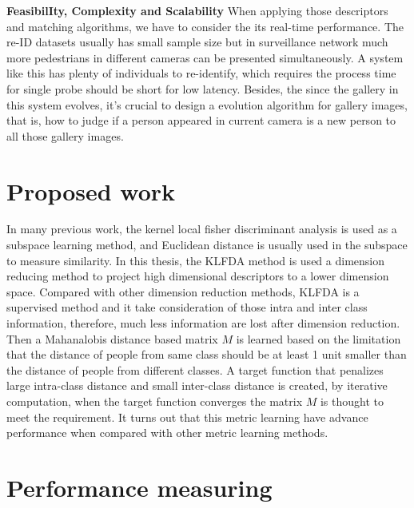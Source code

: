 \textbf{FeasibilIty, Complexity and Scalability} When applying those descriptors and matching algorithms, we have to consider the its real-time performance.   The re-ID datasets usually has small sample size but in surveillance network much more pedestrians in different cameras can be presented simultaneously. A system like this has plenty of individuals to re-identify, which requires the process time for single probe should be short for low latency. Besides, the since the gallery in this system evolves, it's crucial to design a evolution algorithm for gallery images, that is, how to judge if a person appeared in current camera is a new person to all those gallery images.

\section{Proposed work}
In many previous work, the kernel local fisher discriminant analysis is used as a subspace learning method, and Euclidean distance is usually used in the subspace to measure similarity. In this thesis, the KLFDA \cite{KLFDA} method is used a dimension reducing method to project high dimensional descriptors to a lower dimension space. Compared with other dimension reduction methods, KLFDA is a supervised method and it take consideration of those intra and inter class information, therefore, much less information are lost after dimension reduction. Then a Mahanalobis distance based matrix $M$ is learned based on the limitation that the distance of people from same class should be at least 1 unit smaller than the distance of people from different classes. A target function that penalizes large intra-class distance and small inter-class distance is created, by iterative computation, when the target function converges the matrix $M$ is thought to meet the requirement. It turns out that this metric learning have advance performance when compared with other metric learning methods.



\section{Performance measuring}

